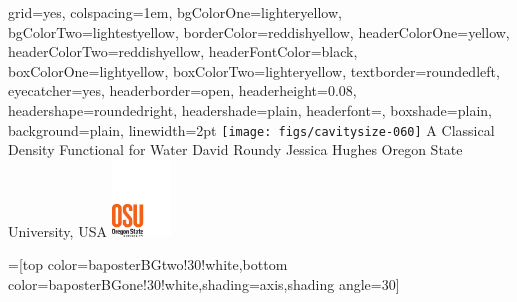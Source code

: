 \documentclass[landscape,a0paper,final,showframe]{baposter}
\begin{document}

\begin{poster}{
  grid=yes,
  colspacing=1em,
  bgColorOne=lighteryellow,
  bgColorTwo=lightestyellow,
  borderColor=reddishyellow,
  headerColorOne=yellow,
  headerColorTwo=reddishyellow,
  headerFontColor=black,
  boxColorOne=lightyellow,
  boxColorTwo=lighteryellow,
  textborder=roundedleft,
  eyecatcher=yes,
  headerborder=open,
  headerheight=0.08\textheight,
  headershape=roundedright,
  headershade=plain,
  headerfont=\Large\textsf, %
  boxshade=plain,
  background=plain,
  linewidth=2pt
  }
  { %
    \texttt{[image: figs/cavitysize-060]}
  }
  {\sf %
  A Classical Density Functional for Water}
  {\sf %
  David Roundy\hspace{3em}
  Jessica Hughes\hspace{3em}
  Oregon State University, USA
  }
  {
    \includegraphics[height=5.5em]{figs/osu-logo}
  }

  =[top color=baposterBGtwo!30!white,bottom color=baposterBGone!30!white,shading=axis,shading angle=30]

     \newlength{\leftimgwidth}
     \setlength{\leftimgwidth}{0.78em+8.0em}


\end{poster}
\end{document}
